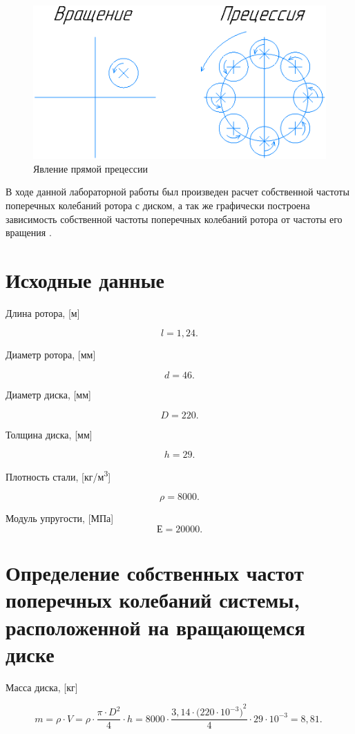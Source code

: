 \begin{figure}[h]
\center
\includegraphics[width=120mm]{prec.png}
\caption{Явление прямой прецессии} \label{fig:1}
\end{figure}

В ходе данной лабораторной работы был произведен расчет собственной частоты поперечных колебаний ротора с диском, а так же графически построена зависимость собственной частоты поперечных колебаний ротора от частоты его вращения . 

\section{Исходные данные}

Длина ротора, [м]

\[l = 1,24.\]

Диаметр ротора, [мм]

\[d = 46.\]

Диаметр диска, [мм]

\[D = 220.\]

Толщина диска, [мм]

\[h = 29.\]

Плотность стали, [кг/м\textsuperscript{3}]

\[\rho = 8000.\]

Модуль упругости, [МПа]
\[Е = 20000.\]


\section{Определение собственных частот поперечных колебаний системы,
  расположенной на вращающемся диске}

Масса диска, [кг]

\[m = \rho\cdot V = \rho\cdot\frac{\pi\cdot D^{2}}{4}\cdot h = 8000\cdot\frac{3,14\cdot({220\cdot10^{- 3})}^{2}}{4}\cdot29\cdot10^{- 3} = 8,81.\ \]

